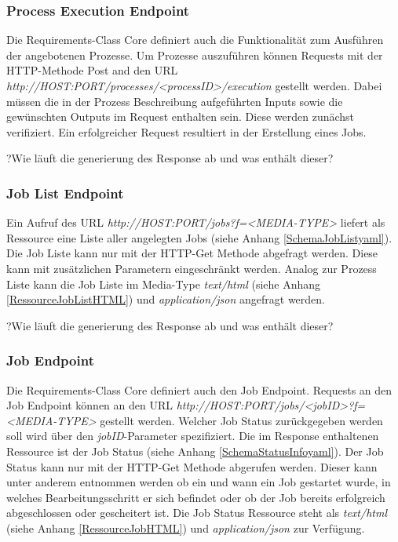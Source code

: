 \subsubsection{Process Execution Endpoint}
Die Requirements-Class Core definiert auch die Funktionalität zum Ausführen der angebotenen Prozesse.
Um Prozesse auszuführen können Requests mit der HTTP-Methode Post and den URL \textit{http://HOST:PORT/processes/<processID>/execution} gestellt werden.
Dabei müssen die in der Prozess Beschreibung aufgeführten Inputs sowie die gewünschten Outputs im Request enthalten sein. 
Diese werden zunächst verifiziert. Ein erfolgreicher Request resultiert in der Erstellung eines Jobs.              

?Wie läuft die generierung des Response ab und was enthält dieser?

\subsubsection{Job List Endpoint}
Ein Aufruf des URL \textit{http://HOST:PORT/jobs?f=<MEDIA-TYPE>} liefert als Ressource eine Liste aller angelegten Jobs (siehe Anhang \ref{SchemaJobListyaml}). 
Die Job Liste kann nur mit der HTTP-Get Methode abgefragt werden.
Diese kann mit zusätzlichen Parametern eingeschränkt werden. 
Analog zur Prozess Liste kann die Job Liste im Media-Type \textit{text/html} (siehe Anhang \ref{RessourceJobListHTML})
und \textit{application/json} angefragt werden. 

?Wie läuft die generierung des Response ab und was enthält dieser?

\subsubsection{Job Endpoint}
Die Requirements-Class Core definiert auch den Job Endpoint.
Requests an den Job Endpoint können an den URL \textit{http://HOST:PORT/jobs/<jobID>?f=<MEDIA-TYPE>} gestellt werden. 
Welcher Job Status zurückgegeben werden soll wird über den \textit{jobID}-Parameter spezifiziert. 
Die im Response enthaltenen Ressource ist der Job Status (siehe Anhang \ref{SchemaStatusInfoyaml}). Der Job Status kann nur mit der HTTP-Get Methode abgerufen werden. 
Dieser kann unter anderem entnommen werden ob ein und wann ein Job gestartet wurde, in welches Bearbeitungsschritt er sich befindet oder ob der Job bereits 
erfolgreich abgeschlossen oder gescheitert ist. 
Die Job Status Ressource steht als \textit{text/html} (siehe Anhang \ref{RessourceJobHTML}) und \textit{application/json} zur Verfügung. 


